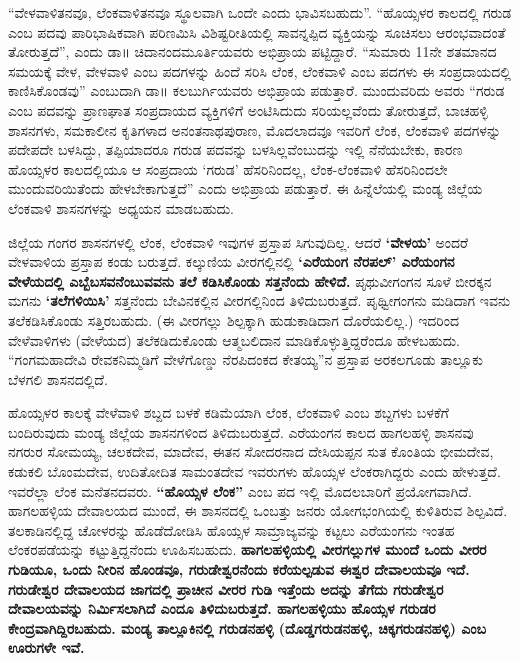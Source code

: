 “ವೇಳವಾಳಿತನವೂ, ಲೆಂಕವಾಳಿತನವೂ ಸ್ಥೂಲವಾಗಿ ಒಂದೇ ಎಂದು ಭಾವಿಸಬಹುದು”. “ಹೊಯ್ಸಳರ ಕಾಲದಲ್ಲಿ ಗರುಡ ಎಂಬ ಪದವು ಪಾರಿಭಾಷಿಕವಾಗಿ ಪರಿಣಮಿಸಿ ವಿಶಿಷ್ಟರೀತಿಯಲ್ಲಿ ಸಾವನ್ನಪ್ಪಿದ ವ್ಯಕ್ತಿಯನ್ನು ಸೂಚಿಸಲು ಆರಂಭವಾದಂತೆ ತೋರುತ್ತದೆ”, ಎಂದು ಡಾ॥ ಚಿದಾನಂದಮೂರ್ತಿಯವರು ಅಭಿಪ್ರಾಯ ಪಟ್ಟಿದ್ದಾರೆ. “ಸುಮಾರು 11ನೇ ಶತಮಾನದ ಸಮಯಕ್ಕೆ ವೇಳ, ವೇಳವಾಳಿ ಎಂಬ ಪದಗಳನ್ನು ಹಿಂದೆ ಸರಿಸಿ ಲೆಂಕ, ಲೆಂಕವಾಳಿ ಎಂಬ ಪದಗಳು ಈ ಸಂಪ್ರದಾಯದಲ್ಲಿ ಕಾಣಿಸಿಕೊಂಡವು” ಎಂಬುದಾಗಿ ಡಾ॥ ಕಲಬುರ್ಗಿಯವರು ಅಭಿಪ್ರಾಯ ಪಡುತ್ತಾರೆ. ಮುಂದುವರಿದು ಅವರು “ಗರುಡ ಎಂಬ ಪದವನ್ನು ಪ್ರಾಣಘಾತ ಸಂಪ್ರದಾಯದ ವ್ಯಕ್ತಿಗಳಿಗೆ ಅಂಟಿಸಿದುದು ಸರಿಯಲ್ಲವೆಂದು ತೋರುತ್ತದೆ, ಬಾಚಹಳ್ಳಿ ಶಾಸನಗಳು, ಸಮಕಾಲೀನ ಕೃತಿಗಳಾದ ಅನಂತನಾಥಪುರಾಣ, ಮೊದಲಾದವೂ ಇವರಿಗೆ ಲೆಂಕ, ಲೆಂಕವಾಳಿ ಪದಗಳನ್ನು ಪದೇಪದೇ ಬಳಸಿದ್ದು, ತಪ್ಪಿಯಾದರೂ ಗರುಡ ಪದವನ್ನು ಬಳಸಿಲ್ಲವೆಂಬುದನ್ನು ಇಲ್ಲಿ ನೆನೆಯಬೇಕು, ಕಾರಣ ಹೊಯ್ಸಳರ ಕಾಲದಲ್ಲಿಯೂ ಆ ಸಂಪ್ರದಾಯ ‘ಗರುಡ’ ಹೆಸರಿನಿಂದಲ್ಲ, ಲೆಂಕ-ಲೆಂಕವಾಳಿ ಹೆಸರಿನಿಂದಲೇ ಮುಂದುವರಿಯಿತೆಂದು ಹೇಳಬೇಕಾಗುತ್ತದೆ” ಎಂದು ಅಭಿಪ್ರಾಯ ಪಡುತ್ತಾರೆ. ಈ ಹಿನ್ನೆಲೆಯಲ್ಲಿ ಮಂಡ್ಯ ಜಿಲ್ಲೆಯ ಲೆಂಕವಾಳಿ ಶಾಸನಗಳನ್ನು ಅಧ್ಯಯನ ಮಾಡಬಹುದು.

ಜಿಲ್ಲೆಯ ಗಂಗರ ಶಾಸನಗಳಲ್ಲಿ ಲೆಂಕ, ಲೆಂಕವಾಳಿ ಇವುಗಳ ಪ್ರಸ್ತಾಪ ಸಿಗುವುದಿಲ್ಲ. ಆದರೆ \textbf{‘ವೇಳಯ’} ಅಂದರೆ ವೇಳವಾಳಿಯ ಪ್ರಸ್ತಾಪ ಕಂಡು ಬರುತ್ತದೆ. ಕಲ್ಕುಣಿಯ ವೀರಗಲ್ಲಿನಲ್ಲಿ \textbf{‘ಎರೆಯಂಗ ನೆರಪಲ್​’ ಎರೆಯಂಗನ ವೇಳೆಯದಲ್ಲಿ ಎಬ್ಬೆಬಸವನೆಂಬುವವನು ತಲೆ ಕಡಿಸಿಕೊಂಡು ಸತ್ತನೆಂದು ಹೇಳಿದೆ.} ಪೃಥುವೀಗಂಗನ ಸೂಳೆ ಬೀರಕ್ಕನ ಮಗನು \textbf{‘ತಲೆಗಳಿಯಿಸಿ’} ಸತ್ತನೆಂದು ಬೇವಿನಕಲ್ಲಿನ ವೀರಗಲ್ಲಿನಿಂದ ತಿಳಿದುಬರುತ್ತದೆ. ಪೃಥ್ವೀಗಂಗನು ಮಡಿದಾಗ ಇವನು ತಲೆಕಡಿಸಿಕೊಂಡು ಸತ್ತಿರಬಹುದು. (ಈ ವೀರಗಲ್ಲು ಶಿಲ್ಪಕ್ಕಾಗಿ ಹುಡುಕಾಡಿದಾಗ ದೊರೆಯಲಿಲ್ಲ.) ಇದರಿಂದ ವೇಳೆವಾಳಿಗಳು (ವೇಳೆಯದ) ತಲೆಕಡಿದುಕೊಂಡು ಆತ್ಮಬಲಿದಾನ ಮಾಡಿಕೊಳ್ಳುತ್ತಿದ್ದರೆಂದೂ ಹೇಳಬಹುದು. “ಗಂಗಮಹಾದೇವಿ ರೇವಕನಿಮ್ಮಡಿಗೆ ವೇಳೆಗೊಣ್ಡು ನೆರಪಿದಂಕದ ಕೇತಯ್ಯ”ನ ಪ್ರಸ್ತಾಪ ಅರಕಲಗೂಡು ತಾಲ್ಲೂಕು ಬೆಳಗಲಿ ಶಾಸನದಲ್ಲಿದೆ.

ಹೊಯ್ಸಳರ ಕಾಲಕ್ಕೆ ವೇಳೆವಾಳಿ ಶಬ್ದದ ಬಳಕೆ ಕಡಿಮೆಯಾಗಿ ಲೆಂಕ, ಲೆಂಕವಾಳಿ ಎಂಬ ಶಬ್ದಗಳು ಬಳಕೆಗೆ ಬಂದಿರುವುದು ಮಂಡ್ಯ ಜಿಲ್ಲೆಯ ಶಾಸನಗಳಿಂದ ತಿಳಿದುಬರುತ್ತದೆ. ಎರೆಯಂಗನ ಕಾಲದ ಹಾಗಲಹಳ್ಳಿ ಶಾಸನವು ನಗರುರ ಸೋಮಯ್ಯ, ಚಲಕದೇವ, ಮಾದೇವ, ಈತನ ಸೋದರನಾದ ದೇಸಿಯಪ್ಪನ ಸುತ ಕೊಂತಿಯ ಭೀಮದೇವ, ಕಡುಕಲಿ ಬೊಂಮದೇವ, ಉದಿತೋದಿತ ಸಾಮಂತದೇವ ಇವರುಗಳು ಹೊಯ್ಸಳ ಲೆಂಕರಾಗಿದ್ದರು ಎಂದು ಹೇಳುತ್ತದೆ. ಇವರೆಲ್ಲಾ ಲೆಂಕ ಮನೆತನದವರು. \textbf{“ಹೊಯ್ಸಳ ಲೆಂಕ”} ಎಂಬ ಪದ ಇಲ್ಲಿ ಮೊದಲಬಾರಿಗೆ ಪ್ರಯೋಗವಾಗಿದೆ. ಹಾಗಲಹಳ್ಳಿಯ ದೇವಾಲಯದ ಮುಂದೆ, ಈ ಶಾಸನದಲ್ಲಿ ಒಂಬತ್ತು ಜನರು ಯೋಗಭಂಗಿಯಲ್ಲಿ ಕುಳಿತಿರುವ ಶಿಲ್ಪವಿದೆ. ತಲಕಾಡಿನಲ್ಲಿದ್ದ ಚೋಳರನ್ನು ಹೊಡೆದೋಡಿಸಿ ಹೊಯ್ಸಳ ಸಾಮ್ರಾಜ್ಯವನ್ನು ಕಟ್ಟಲು ಎರೆಯಂಗನು ಇಂತಹ ಲೆಂಕರಪಡೆಯನ್ನು ಕಟ್ಟುತ್ತಿದ್ದನೆಂದು ಊಹಿಸಬಹುದು. \textbf{ಹಾಗಲಹಳ್ಳಿಯಲ್ಲಿ ವೀರಗಲ್ಲುಗಳ ಮುಂದೆ ಒಂದು ವೀರರ ಗುಡಿಯೂ, ಒಂದು ನೀರಿನ ಹೊಂಡವೂ, ಗರುಡೇಶ್ವರನೆಂದು ಕರೆಯಲ್ಪಡುವ ಈಶ್ವರ ದೇವಾಲಯವೂ ಇದೆ. ಗರುಡೇಶ್ವರ ದೇವಾಲಯದ ಜಾಗದಲ್ಲಿ ಪ್ರಾಚೀನ ವೀರರ ಗುಡಿ ಇತ್ತೆಂದು ಅದನ್ನು ತೆಗೆದು ಗರುಡೇಶ್ವರ ದೇವಾಲಯವನ್ನು ನಿರ್ಮಿಸಲಾಗಿದೆ ಎಂದೂ ತಿಳಿದುಬರುತ್ತದೆ. ಹಾಗಲಹಳ್ಳಿಯು ಹೊಯ್ಸಳ ಗರುಡರ ಕೇಂದ್ರವಾಗಿದ್ದಿರಬಹುದು. ಮಂಡ್ಯ ತಾಲ್ಲೂಕಿನಲ್ಲಿ ಗರುಡನಹಳ್ಳಿ (ದೊಡ್ಡಗರುಡನಹಳ್ಳಿ, ಚಿಕ್ಕಗರುಡನಹಳ್ಳಿ) ಎಂಬ ಊರುಗಳೇ ಇವೆ. }


